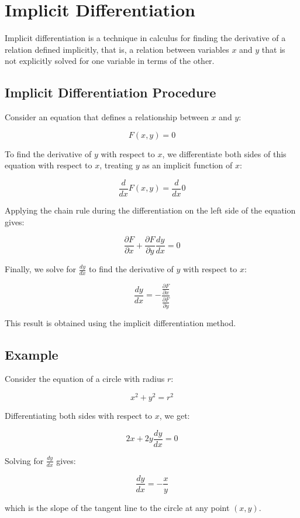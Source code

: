 \chapter{Implicit Differentiation}

Implicit differentiation is a technique in calculus for finding the derivative of a relation defined implicitly, that is, a relation between variables $x$ and $y$ that is not explicitly solved for one variable in terms of the other. 

\section{Implicit Differentiation Procedure}

Consider an equation that defines a relationship between $x$ and $y$:

\[
F(x, y) = 0
\]

To find the derivative of $y$ with respect to $x$, we differentiate both sides of this equation with respect to $x$, treating $y$ as an implicit function of $x$:

\[
\frac{d}{dx} F(x, y) = \frac{d}{dx} 0
\]

Applying the chain rule during the differentiation on the left side of the equation gives:

\[
\frac{\partial F}{\partial x} + \frac{\partial F}{\partial y} \frac{dy}{dx} = 0
\]

Finally, we solve for $\frac{dy}{dx}$ to find the derivative of $y$ with respect to $x$:

\[
\frac{dy}{dx} = -\frac{\frac{\partial F}{\partial x}}{\frac{\partial F}{\partial y}}
\]

This result is obtained using the implicit differentiation method.

\section{Example}

Consider the equation of a circle with radius $r$:

\[
x^2 + y^2 = r^2
\]

Differentiating both sides with respect to $x$, we get:

\[
2x + 2y \frac{dy}{dx} = 0
\]

Solving for $\frac{dy}{dx}$ gives:

\[
\frac{dy}{dx} = -\frac{x}{y}
\]

which is the slope of the tangent line to the circle at any point $(x, y)$.
